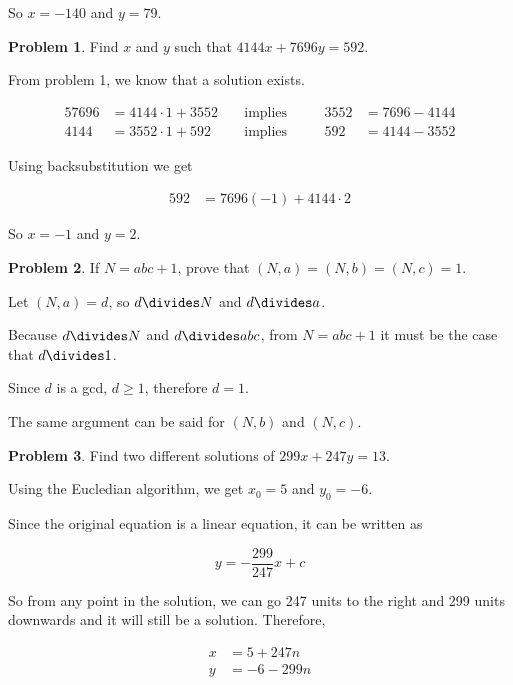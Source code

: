 \documentclass{article}
\theoremstyle{definition}
\newtheorem{problem}{Problem}[section]
\begin{document}
  So $x = -140$ and $y = 79$.
  
  \begin{problem}
    Find $x$ and $y$ such that $4144x + 7696y = 592$.
  \end{problem}
  
  From problem 1, we know that a solution exists.
  
  \begin{alignat*}{5}
    7696 &= 4144 \cdot 1 + 3552 &\;&\text{implies} &\;&&3552 &= 7696 - 4144 \\
    4144 &= 3552 \cdot 1 + 592 &\;&\text{implies} &\;&&592 &= 4144 - 3552
  \end{alignat*}
  
  Using backsubstitution we get
  
  \begin{align*}
    592 &= 7696 (-1) + 4144 \cdot 2
  \end{align*}
  
  So $x = -1$ and $y = 2$.
  
  \begin{problem}
    If $N = abc + 1$, prove that $(N, a) = (N, b) = (N, c) = 1$.
  \end{problem}
  
  Let $(N, a) = d$, so $d \divides N$ and $d \divides a$.
  
  Because $d \divides N$ and $d \divides abc$, from $N = abc + 1$ it must be the case that $d \divides 1$.
  
  Since $d$ is a gcd, $d \geq 1$, therefore $d = 1$.
  
  The same argument can be said for $(N, b)$ and $(N, c)$.
  
  \begin{problem}
    Find two different solutions of $299x + 247y = 13$.
  \end{problem}
  
  Using the Eucledian algorithm, we get $x_0 = 5$ and $y_0 = -6$.
  
  Since the original equation is a linear equation, it can be written as
  
  \begin{equation}
    y = -\frac{299}{247} x + c
  \end{equation}
  
  So from any point in the solution, we can go 247 units to the right
  and 299 units downwards and it will still be a solution. Therefore,
  
  \begin{align*}
    x &= 5 + 247n \\
    y &= -6 -299n
  \end{align*}
  
\end{document}
